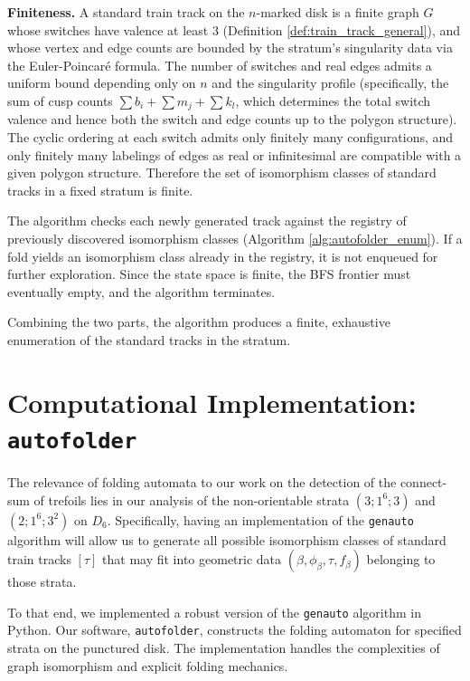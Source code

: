 \begin{myproof}
\textbf{Finiteness.}
A standard train track on the $n$-marked disk is a finite graph $G$ whose switches have valence at least $3$ (Definition \ref{def:train_track_general}), and whose vertex and edge counts are bounded by the stratum's singularity data via the Euler-Poincar\'{e} formula. The number of switches and real edges admits a uniform bound depending only on $n$ and the singularity profile (specifically, the sum of cusp counts $\sum b_i + \sum m_j + \sum k_l$, which determines the total switch valence and hence both the switch and edge counts up to the polygon structure). The cyclic ordering at each switch admits only finitely many configurations, and only finitely many labelings of edges as real or infinitesimal are compatible with a given polygon structure. Therefore the set of isomorphism classes of standard tracks in a fixed stratum is finite.

The algorithm checks each newly generated track against the registry of previously discovered isomorphism classes (Algorithm \ref{alg:autofolder_enum}). If a fold yields an isomorphism class already in the registry, it is not enqueued for further exploration. Since the state space is finite, the BFS frontier must eventually empty, and the algorithm terminates.

Combining the two parts, the algorithm produces a finite, exhaustive enumeration of the standard tracks in the stratum.
\end{myproof}

\section{Computational Implementation: \texttt{autofolder}}
\label{sec:implementation}
The relevance of folding automata to our work on the detection of the connect-sum of trefoils lies in our analysis of the non-orientable strata $(3;1^6;3)$ and $(2;1^6;3^2)$ on $D_6$. Specifically, having an implementation of the \texttt{genauto} algorithm will allow us to generate all possible isomorphism classes of standard train tracks $[\tau]$ that may fit into geometric data $(\beta, \phi_\beta, \tau, f_\beta)$ belonging to those strata.

To that end, we implemented a robust version of the \texttt{genauto} algorithm in Python. Our software, \texttt{autofolder}, constructs the folding automaton for specified strata on the punctured disk. The implementation handles the complexities of graph isomorphism and explicit folding mechanics.

